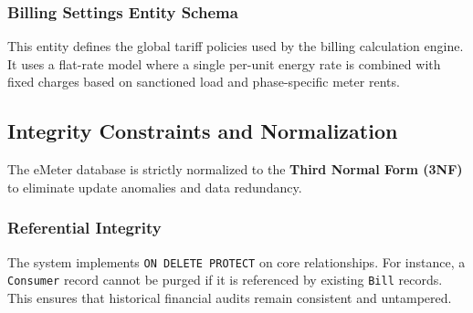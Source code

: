 \documentclass[12pt, a4paper, onecolumn]{report}
\begin{document}
\subsubsection{Billing Settings Entity Schema}
This entity defines the global tariff policies used by the billing calculation engine. It uses a flat-rate model where a single per-unit energy rate is combined with fixed charges based on sanctioned load and phase-specific meter rents.

\begin{table}[htbp]
\centering
\caption{Billing Settings Table Description}
\label{tab:billingsettings_table}
\end{table}

\subsection{Integrity Constraints and Normalization}
The eMeter database is strictly normalized to the \textbf{Third Normal Form (3NF)} to eliminate update anomalies and data redundancy.

\subsubsection{Referential Integrity}
The system implements \texttt{ON DELETE PROTECT} on core relationships. For instance, a \texttt{Consumer} record cannot be purged if it is referenced by existing \texttt{Bill} records. This ensures that historical financial audits remain consistent and untampered.
\end{document}
